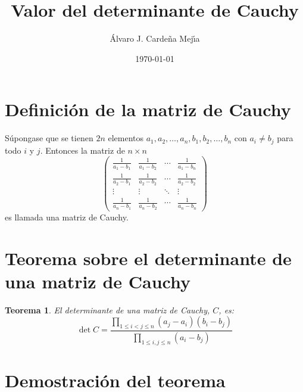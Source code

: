 \documentclass[a4paper,11pt]{article}
\title{Valor del determinante de Cauchy}
\author{\'Alvaro J. Carde\~na Mej\'{\i}a}
\date{\today}
\theoremstyle{teoremas}
\newtheorem{teorema}{Teorema}[section]
\theoremstyle{ejemplos}
\theoremstyle{definiciones}
\theoremstyle{lemas}
\begin{document}
\maketitle

\section{Definici\'on de la matriz de Cauchy}

S\'upongase que se tienen $2n$ elementos $a_1, a_2, \ldots, a_n, b_1, b_2, \ldots, b_n$ con $a_i \neq b_j$ para todo $i$ y $j$. Entonces la matriz de $n\times n$
\begin{equation}
 \begin{pmatrix}
  \displaystyle{ \frac{1}{a_1 - b_1} } & \displaystyle{ \frac{1}{a_1 - b_2} } & \cdots & \displaystyle{ \frac{1}{a_1 - b_n} } \\
  \displaystyle{ \frac{1}{a_2 - b_1} } & \displaystyle{ \frac{1}{a_2 - b_2} } & \cdots & \displaystyle{ \frac{1}{a_2 - b_2} } \\
  \vdots & \vdots & \ddots & \vdots \\
  \displaystyle{ \frac{1}{a_n - b_1} } & \displaystyle{ \frac{1}{a_n - b_2} } & \cdots & \displaystyle{ \frac{1}{a_n - b_n} }
 \end{pmatrix}
\end{equation}
es llamada una matriz de Cauchy.

\section{Teorema sobre el determinante de una matriz de Cauchy}

\begin{teorema}
 El determinante de una matriz de Cauchy, $C$, es:
 \begin{equation*}
  \det C = \frac{\displaystyle{ \prod_{1 \leq i < j \leq n} (a_j - a_i)(b_i - b_j) }}{\displaystyle{ \prod_{1 \leq i,j \leq n} (a_i - b_j) }} 
 \end{equation*}
\end{teorema}

\section{Demostraci\'on del teorema}
\end{document}
